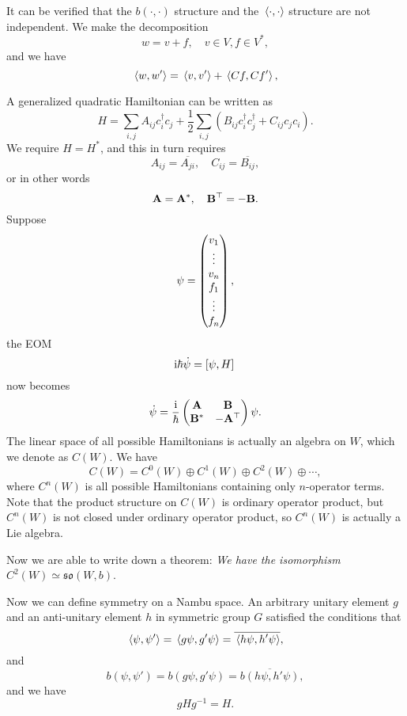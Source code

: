 \documentclass[hyperref, a4paper]{article}
\newcommand*{\ii}{\mathrm{i}}
\begin{document}
It can be verified that the $b(\cdot, \cdot)$ structure and the $\expval*{\cdot, \cdot}$ structure are not
independent. We make the decomposition 
\begin{equation}
    w = v + f, \quad v \in V, f \in V^*,
\end{equation}
and we have
\begin{equation}
    \expval*{w, w'} = \expval*{v, v'} + \expval*{Cf, Cf'},
\end{equation}

A generalized quadratic Hamiltonian can be written as 
\begin{equation}
    H = \sum_{i,j} A_{ij} c^\dagger_i c_j + 
    \frac{1}{2} \sum_{i,j} (B_{ij} c_i^\dagger c_j^\dagger + C_{ij} c_j c_i).
\end{equation}
We require $H = H^*$, and this in turn requires 
\begin{equation}
    A_{ij} = \overline{A_{ji}}, \quad C_{ij} = \overline{B_{ij}},
\end{equation}
or in other words 
\begin{equation}
    \vb{A} = \vb{A}^*, \quad \vb{B}^\top = - \vb{B}.
\end{equation}
Suppose 
\begin{equation}
    \psi = \pmqty{v_1 \\ \vdots \\ v_n \\ f_1 \\ \vdots \\ f_n},
\end{equation}
the EOM
\[
    \ii \hbar \dot{\psi} = \comm*{\psi}{H}
\]
now becomes 
\begin{equation}
    \dot{\psi} = \frac{\ii}{\hbar} \pmqty{\vb{A} & \vb{B} \\ \vb{B}^* & - \vb{A}^\top} \psi.
\end{equation}
The linear space of all possible Hamiltonians is actually an algebra on $W$, which we denote as $C(W)$.
We have 
\begin{equation}
    C(W) = C^0(W) \oplus C^1(W) \oplus C^2(W) \oplus \cdots,
\end{equation} 
where $C^n(W)$ is all possible Hamiltonians containing only $n$-operator terms. Note that the product 
structure on $C(W)$ is ordinary operator product, but $C^n(W)$ is not closed under ordinary operator product,
so $C^n(W)$ is actually a Lie algebra.

Now we are able to write down a theorem: 
\emph{We have the isomorphism $C^2(W) \simeq \mathfrak{so}(W, b)$}.

Now we can define symmetry on a Nambu space. An arbitrary unitary element $g$ and an anti-unitary element $h$ 
in symmetric group $G$ satisfied the conditions that 
\begin{equation}
    \expval*{\psi, \psi'} = \expval*{g \psi, g' \psi} = \overline{\expval*{h \psi, h' \psi}},
\end{equation}
and 
\begin{equation}
    b(\psi, \psi') = b(g \psi, g' \psi) = \overline{b(h \psi, h' \psi)},
\end{equation}
and we have 
\begin{equation}
    g H g^{-1} = H.
\end{equation}
\end{document}
